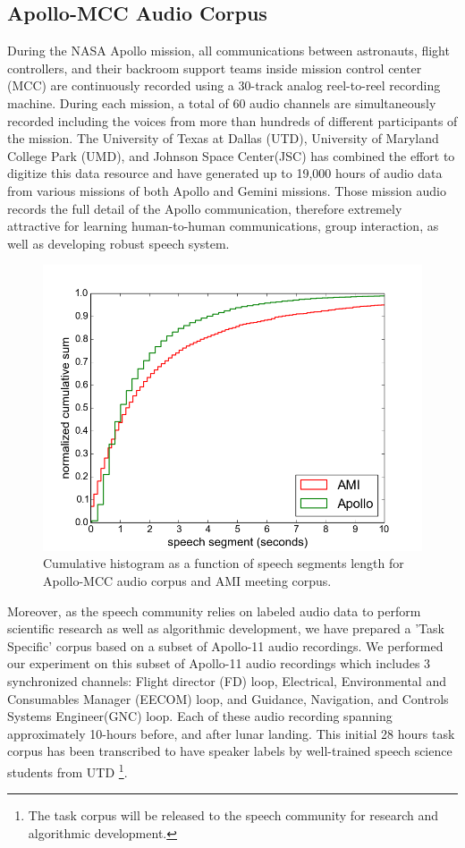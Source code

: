 \documentclass[journal,10pt]{IEEEtran}
\begin{document}
\subsection{Apollo-MCC Audio Corpus}
\label{apollo}
During the NASA Apollo mission, all communications between astronauts, flight controllers, and their backroom support teams inside mission control center (MCC) are continuously recorded using a 30-track analog reel-to-reel recording machine. During each mission, a total of 60 audio channels are simultaneously recorded including the voices from more than hundreds of different participants of the mission. The University of Texas at Dallas (UTD), University of Maryland College Park (UMD), and Johnson Space Center(JSC) has combined the effort to digitize this data resource and have generated up to 19,000 hours of audio data from various missions of both Apollo and Gemini missions. Those mission audio records the full detail of the Apollo communication, therefore extremely attractive for learning human-to-human communications, group interaction, as well as developing robust speech system. 

\begin{figure}[t]
	\includegraphics[width=\linewidth]{figs/lens}
	\caption{Cumulative histogram as a function of speech segments length for Apollo-MCC audio corpus and AMI meeting corpus.}
	\label{fig:cumu}
\end{figure}

Moreover, as the speech community relies on labeled audio data to perform scientific research as well as algorithmic development, we have prepared a 'Task Specific' corpus based on a subset of Apollo-11 audio recordings. We performed our experiment on this subset of Apollo-11 audio recordings which includes 3 synchronized channels: Flight director (FD) loop, Electrical, Environmental and Consumables Manager (EECOM) loop, and Guidance, Navigation, and Controls Systems Engineer(GNC) loop.  Each of these audio recording spanning approximately 10-hours before, and after lunar landing. This initial 28 hours task corpus has been transcribed to have speaker labels by well-trained speech science students from UTD \footnote{The task corpus will be released to the speech community for research and algorithmic development.}.
\end{document}
